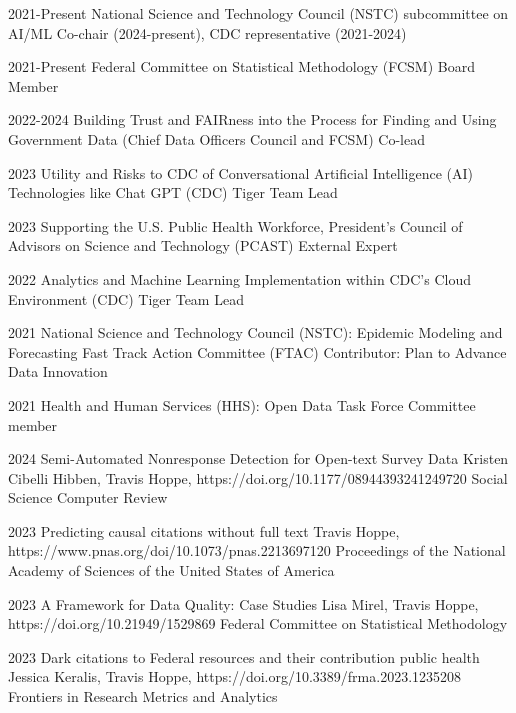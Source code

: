\documentclass[]{scrartcl}
\begin{document}
\begin{cleanCV}

\WorkExperienceX
{2021-Present}
{National Science and Technology Council (NSTC) subcommittee on AI/ML}
{Co-chair (2024-present), CDC representative (2021-2024)}

\WorkExperienceX
{2021-Present}
{Federal Committee on Statistical Methodology (FCSM)}
{Board Member}

\WorkExperienceX
{2022-2024}
{Building Trust and FAIRness into the Process for Finding and Using Government Data (Chief Data Officers Council and FCSM)}
{Co-lead}

\WorkExperienceX
{2023}
{Utility and Risks to CDC of Conversational Artificial Intelligence (AI) Technologies like Chat GPT (CDC)}
{Tiger Team Lead}

\WorkExperienceX
{2023}
{Supporting the U.S. Public Health Workforce, President's Council of Advisors on Science and Technology (PCAST)}
{External Expert}

\WorkExperienceX
{2022}
{Analytics and Machine Learning Implementation within CDC's Cloud Environment (CDC)}
{Tiger Team Lead}

\WorkExperienceX
{2021}
{National Science and Technology Council (NSTC): Epidemic Modeling and Forecasting Fast Track Action Committee (FTAC)}
{Contributor: Plan to Advance Data Innovation}

\WorkExperienceX
{2021}
{Health and Human Services (HHS): Open Data Task Force}
{Committee member}


\vspace{0.5em}
\Paper
{2024}
{Semi-Automated Nonresponse Detection for Open-text Survey Data}
{Kristen Cibelli Hibben, Travis Hoppe, \etal}
{https://doi.org/10.1177/08944393241249720}
{Social Science Computer Review}

\Paper
{2023}
{Predicting causal citations without full text}
{Travis Hoppe, \etal}
{https://www.pnas.org/doi/10.1073/pnas.2213697120}
{Proceedings of the National Academy of Sciences of the United States of America}

\Paper
{2023}
{A Framework for Data Quality: Case Studies}
{Lisa Mirel, Travis Hoppe, \etal}
{https://doi.org/10.21949/1529869}
{Federal Committee on Statistical Methodology}

\Paper
{2023}
{Dark citations to Federal resources and their contribution public health}
{Jessica Keralis, Travis Hoppe, \etal}
{https://doi.org/10.3389/frma.2023.1235208}
{Frontiers in Research Metrics and Analytics}


\end{cleanCV}
\end{document}
